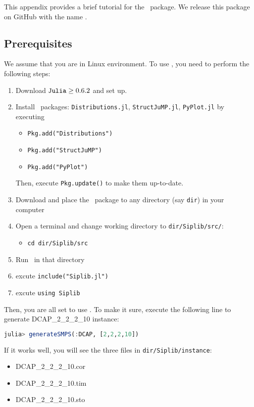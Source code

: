 This appendix provides a brief tutorial for the \julia\ package. We release this package on GitHub with the name \siplibjl.

\subsection{Prerequisites}
We assume that you are in Linux environment. To use \siplibjl, you need to perform the following steps:
\begin{enumerate}
	\item Download $\texttt{Julia}\ge 0.6.2$ and set up.
	\item Install \julia\ packages: \texttt{Distributions.jl}, \texttt{StructJuMP.jl}, \texttt{PyPlot.jl} by executing
	\begin{itemize}
		\item \texttt{Pkg.add("Distributions")}
		\item \texttt{Pkg.add("StructJuMP")}
		\item \texttt{Pkg.add("PyPlot")}
	\end{itemize}
	Then, execute \texttt{Pkg.update()} to make them up-to-date.
	\item Download and place the \siplibjl\ package to any directory (say \texttt{dir}) in your computer
	\item Open a terminal and change working directory to \texttt{dir/Siplib/src/}:
	\begin{itemize}
		\item \texttt{cd dir/Siplib/src}	
	\end{itemize}
	\item Run \julia\ in that directory
	\item excute \texttt{include("Siplib.jl")}
	\item excute \texttt{using Siplib}
\end{enumerate}
Then, you are all set to use \siplibjl. To make it sure, execute the following line to generate DCAP\_2\_2\_2\_10 instance:
\begin{lstlisting}[frame=single,language=julia]
julia> generateSMPS(:DCAP, [2,2,2,10])
\end{lstlisting}
If it works well, you will see the three files in \texttt{dir/Siplib/instance}:
\begin{itemize}
	\item DCAP\_2\_2\_2\_10.cor
	\item DCAP\_2\_2\_2\_10.tim
	\item DCAP\_2\_2\_2\_10.sto
\end{itemize}


